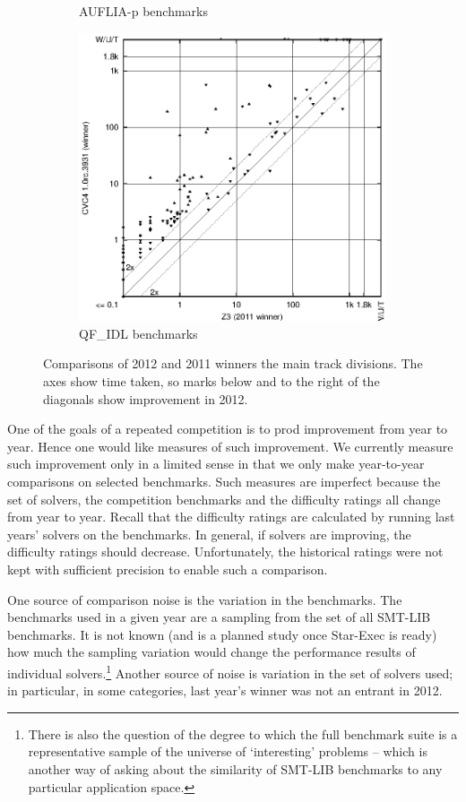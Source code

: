 \documentclass[twosize,11pt]{article}
\begin{document}
\begin{figure}[ht]
\begin{subfigure}{0.45\textwidth}
	   \caption{AUFLIA-p benchmarks}
	\end{subfigure}	
\begin{subfigure}{0.45\textwidth}
	   \includegraphics[width=1\textwidth]{QF_IDL-scatter-improvement.eps}
	   \caption{QF\_IDL benchmarks}
	\end{subfigure}	
\caption{Comparisons of 2012 and 2011 winners the main track divisions. The axes show time taken, so marks below and to the right of the diagonals show improvement in 2012.}
\label{Comparisons}
\end{figure}

One of the goals of a repeated competition is to prod improvement from year to year. Hence one would like measures of such improvement. We currently measure such improvement only in a limited sense in that we only make year-to-year comparisons on selected benchmarks. Such measures are imperfect because the set of solvers, the competition benchmarks and the difficulty ratings all change from year to year. Recall that the difficulty ratings are calculated by running last years' solvers on the benchmarks. In general, if solvers are improving, the difficulty ratings should decrease. Unfortunately, the historical ratings were not kept with sufficient precision to enable such a comparison. 

One source of comparison noise is the variation in the benchmarks. The benchmarks used in a given year are a sampling from the set of all SMT-LIB benchmarks. It is not known (and is a planned study once Star-Exec is ready) how much the sampling variation would change the performance results of individual solvers.\footnote{There is also the question of the degree to which the full benchmark suite is a representative sample of the universe of `interesting' problems -- which is another way of asking about the similarity of SMT-LIB benchmarks to any particular application space.} Another source of noise is variation in the set of solvers used; in particular, in some categories, last year's winner was not an entrant in 2012.
\end{document}
